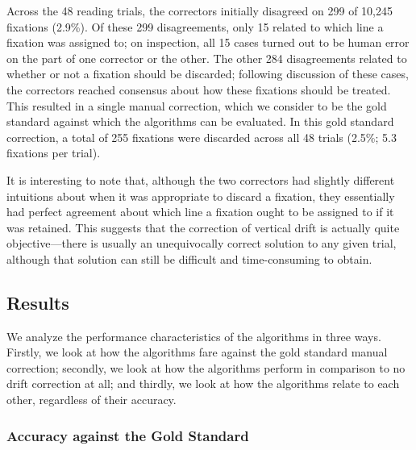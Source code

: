 \documentclass[doc,biblatex]{apa7}
\begin{document}
Across the 48 reading trials, the correctors initially disagreed on 299 of 10,245 fixations (2.9\%). Of these 299 disagreements, only 15 related to which line a fixation was assigned to; on inspection, all 15 cases turned out to be human error on the part of one corrector or the other. The other 284 disagreements related to whether or not a fixation should be discarded; following discussion of these cases, the correctors reached consensus about how these fixations should be treated. This resulted in a single manual correction, which we consider to be the gold standard against which the algorithms can be evaluated. In this gold standard correction, a total of 255 fixations were discarded across all 48 trials (2.5\%; 5.3 fixations per trial).

It is interesting to note that, although the two correctors had slightly different intuitions about when it was appropriate to discard a fixation, they essentially had perfect agreement about which line a fixation ought to be assigned to if it was retained. This suggests that the correction of vertical drift is actually quite objective---there is usually an unequivocally correct solution to any given trial, although that solution can still be difficult and time-consuming to obtain.

\subsection{Results}

We analyze the performance characteristics of the algorithms in three ways. Firstly, we look at how the algorithms fare against the gold standard manual correction; secondly, we look at how the algorithms perform in comparison to no drift correction at all; and thirdly, we look at how the algorithms relate to each other, regardless of their accuracy.

\subsubsection{Accuracy against the Gold Standard}
\end{document}

